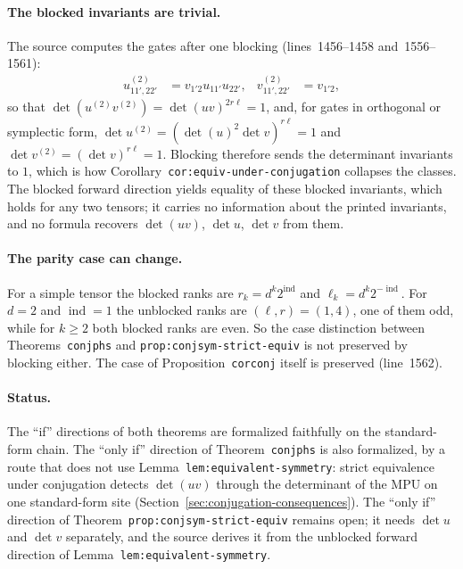 \documentclass{article}
\begin{document}
\paragraph{The blocked invariants are trivial.} The source computes the gates
after one blocking (lines~1456--1458 and~1556--1561):
\begin{align}
    u^{(2)}_{11',22'} & = v_{1'2}u_{11'}u_{22'}, &
    v^{(2)}_{11',22'} & = v_{1'2},
    \label{eq:mpu_symmetry_path_criterion_blocking_1}
\end{align}
so that $\det(u^{(2)}v^{(2)})=\det(uv)^{2r\ell}=1$, and, for gates in
orthogonal or symplectic form, $\det u^{(2)}=(\det(u)^2\det v)^{r\ell}=1$ and
$\det v^{(2)}=(\det v)^{r\ell}=1$. Blocking therefore sends the determinant
invariants to $1$, which is how Corollary~\texttt{cor:equiv-under-conjugation}
collapses the classes. The blocked forward direction yields equality of these
blocked invariants, which holds for any two tensors; it carries no information
about the printed invariants, and no formula recovers $\det(uv)$, $\det u$,
$\det v$ from them.

\paragraph{The parity case can change.} For a simple tensor the blocked ranks
are $r_k=d^k2^{\operatorname{ind}}$ and $\ell_k=d^k2^{-\operatorname{ind}}$.
For $d=2$ and $\operatorname{ind}=1$ the unblocked ranks are $(\ell,r)=(1,4)$,
one of them odd, while for $k\ge2$ both blocked ranks are even. So the case
distinction between Theorems~\texttt{conjphs} and
\texttt{prop:conjsym-strict-equiv} is not preserved by blocking either. The
case of Proposition~\texttt{corconj} itself is preserved (line~1562).

\paragraph{Status.} The ``if'' directions of both theorems are formalized
faithfully on the standard-form chain. The ``only if'' direction of
Theorem~\texttt{conjphs} is also formalized, by a route that does not use
Lemma~\texttt{lem:equivalent-symmetry}: strict equivalence under conjugation
detects $\det(uv)$ through the determinant of the MPU on one standard-form
site (Section~\ref{sec:conjugation-consequences}). The ``only if'' direction
of Theorem~\texttt{prop:conjsym-strict-equiv} remains open; it needs
$\det u$ and $\det v$ separately, and the source derives it from the
unblocked forward direction of Lemma~\texttt{lem:equivalent-symmetry}.
\end{document}

